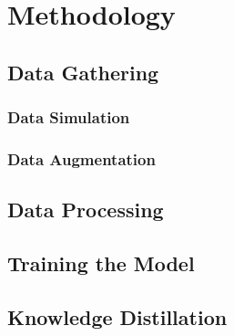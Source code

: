 \chapter{Methodology}

\section{Data Gathering}


\subsection*{Data Simulation}

\subsection*{Data Augmentation}

\section{Data Processing}





\section{Training the Model}



\section{Knowledge Distillation}




